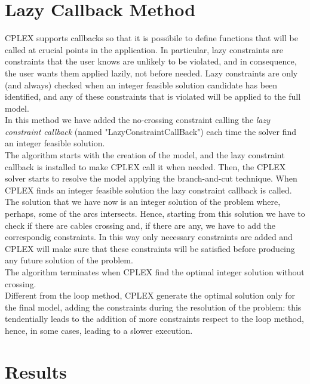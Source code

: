 \section{Lazy Callback Method}
\textsc{CPLEX} supports callbacks so that it is possibile to define functions that will be called at crucial points in the application. In particular, lazy constraints are constraints that the user knows are unlikely to be violated, and in consequence, the user
wants them applied lazily, not before needed. Lazy constraints are only (and always) checked when an integer feasible solution candidate has been identified, and any of these constraints that is violated will be applied to the full model. \\
In this method we have added the no-crossing constraint calling the \textit{lazy constraint callback} (named "LazyConstraintCallBack") each time the solver find an integer feasible solution. \\
The algorithm starts with the creation of the model, and the lazy constraint callback is installed to make \textsc{CPLEX} call it when needed. Then, the \textsc{CPLEX} solver starts to resolve the model applying the branch-and-cut technique. When \textsc{CPLEX} finds an integer feasible solution the lazy constraint callback is called. The solution that we have now is an integer solution of the problem where, perhaps, some of
the arcs intersects. Hence, starting from this solution we have to check if there are cables crossing and, if there are any, we have to add the correspondig constraints. In this way only necessary constraints are added and \textsc{CPLEX} will make sure that these constraints will be satisfied before producing any future solution of the problem.\\
The algorithm terminates when \textsc{CPLEX} find the optimal integer solution without crossing. \\
Different from the loop method, \textsc{CPLEX} generate the optimal solution only for the final model, adding the constraints during the resolution of the problem: this tendentially leads to the addition of more constraints respect to the loop method, hence, in some cases, leading to a slower execution.

\section{Results}
